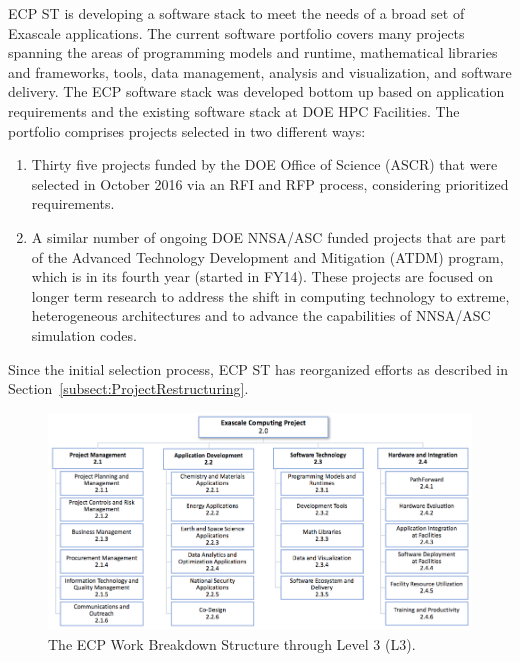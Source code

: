 
ECP ST is developing a software stack to meet the needs of a broad set of Exascale applications. The current software portfolio covers many projects spanning the areas of programming models and runtime, mathematical libraries and frameworks, tools, data management, analysis and visualization, and software delivery. The ECP software stack was developed bottom up based on application requirements and the existing software stack at DOE HPC Facilities. The portfolio comprises projects selected in two different ways: 
\begin{enumerate}
\item Thirty five projects funded by the DOE Office of Science (ASCR) that were selected in October 2016 via an RFI and RFP process, considering prioritized requirements.
\item A similar number of ongoing DOE NNSA/ASC funded projects that are part of the Advanced Technology Development and Mitigation (ATDM) program, which is in its fourth year (started in FY14). These projects are focused on longer term research to address the shift in computing technology to extreme, heterogeneous architectures and to advance the capabilities of NNSA/ASC simulation codes. 
\end{enumerate}
Since the initial selection process, ECP ST has reorganized efforts as described in Section~\ref{subsect:ProjectRestructuring}.

\begin{figure}
	\centering
	\includegraphics[width=0.9\linewidth]{ECP20}
	\caption{The ECP Work Breakdown Structure through Level 3 (L3).}
	\label{fig:ecp2}
\end{figure}

